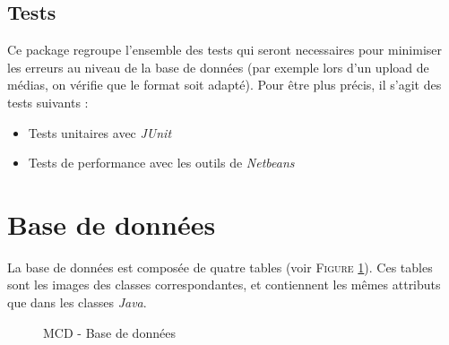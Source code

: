 \subsection{Tests}

Ce package regroupe l'ensemble des tests qui seront necessaires pour minimiser les erreurs au niveau de la base de données (par exemple lors d'un upload de médias, on vérifie que le format soit adapté). Pour être plus précis, il s'agit des tests suivants :
\begin{itemize}
 \item Tests unitaires avec \textit{JUnit}
 \item Tests de performance avec les outils de \textit{Netbeans}
\end{itemize}


\section{Base de données}

La base de données est composée de quatre tables (voir \textsc{Figure} \ref{MCD}). Ces tables sont les images des classes correspondantes, et contiennent les mêmes attributs que dans les classes \textit{Java}.

\begin{figure}[!h]
\begin{center}
  \caption{MCD - Base de données}
  \label{MCD} 
\end{center}
\end{figure}


